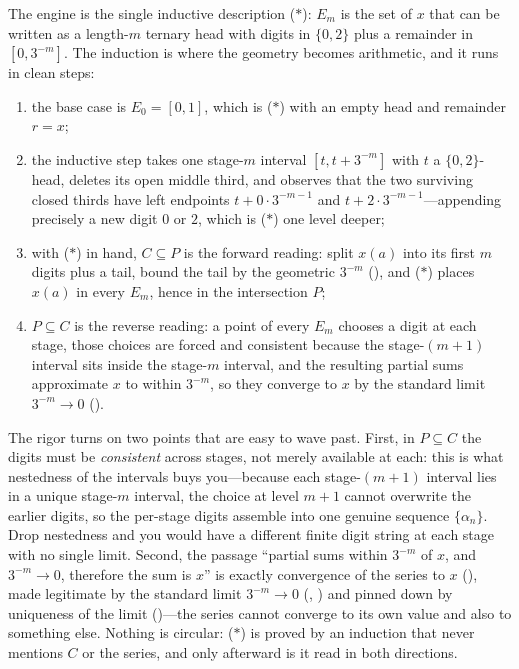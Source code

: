 \documentclass[main.tex]{subfiles}
\begin{document}
\begin{Reflection}
The engine is the single inductive description ($\ast$): $E_{m}$ is the set of $x$ that can be written as
a length-$m$ ternary head with digits in $\{0,2\}$ plus a remainder in $[0,3^{-m}]$. The induction is
where the geometry becomes arithmetic, and it runs in clean steps:
\begin{enumerate}[leftmargin=1.7em,itemsep=3pt,topsep=2pt,label=\textnormal{(\arabic*)}]
  \item the base case is $E_{0}=[0,1]$, which is ($\ast$) with an empty head and remainder $r=x$;
  \item the inductive step takes one stage-$m$ interval $[t,t+3^{-m}]$ with $t$ a $\{0,2\}$-head, deletes
        its open middle third, and observes that the two surviving closed thirds have left endpoints
        $t+0\cdot 3^{-m-1}$ and $t+2\cdot 3^{-m-1}$---appending precisely a new digit $0$ or $2$, which
        is ($\ast$) one level deeper;
  \item with ($\ast$) in hand, $C\subseteq P$ is the forward reading: split $x(a)$ into its first $m$
        digits plus a tail, bound the tail by the geometric $3^{-m}$ (), and ($\ast$) places
        $x(a)$ in every $E_{m}$, hence in the intersection $P$;
  \item $P\subseteq C$ is the reverse reading: a point of every $E_{m}$ chooses a digit at each stage,
        those choices are forced and consistent because the stage-$(m+1)$ interval sits inside the
        stage-$m$ interval, and the resulting partial sums approximate $x$ to within $3^{-m}$, so they
        converge to $x$ by the standard limit $3^{-m}\to 0$ ().
\end{enumerate}

The rigor turns on two points that are easy to wave past. First, in $P\subseteq C$ the digits must be
\emph{consistent} across stages, not merely available at each: this is what nestedness of the intervals
buys you---because each stage-$(m+1)$ interval lies in a unique stage-$m$ interval, the choice at level
$m+1$ cannot overwrite the earlier digits, so the per-stage digits assemble into one genuine sequence
$\{\alpha_{n}\}$. Drop nestedness and you would have a different finite digit string at each stage with
no single limit. Second, the passage ``partial sums within $3^{-m}$ of $x$, and $3^{-m}\to 0$, therefore
the sum is $x$'' is exactly convergence of the series to $x$ (), made legitimate by the
standard limit $3^{-m}\to 0$ (, ) and pinned down by
uniqueness of the limit ()---the series cannot converge to its
own value and also to something else. Nothing is circular: ($\ast$) is proved by an induction that never
mentions $C$ or the series, and only afterward is it read in both directions.


\end{Reflection}
\end{document}
